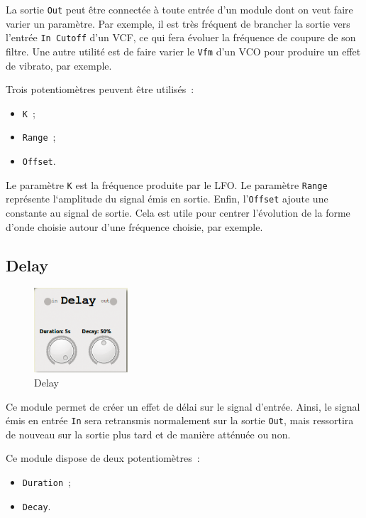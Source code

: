 \documentclass[a4paper,oneside,frenchb,10pt]{article}
\begin{document}
La sortie \verb!Out! peut être connectée à toute entrée d'un module dont
on veut faire varier un paramètre. Par exemple, il est très fréquent de
brancher la sortie vers l'entrée \verb!In Cutoff! d'un VCF, ce qui fera
évoluer la fréquence de coupure de son filtre. Une autre utilité est de
faire varier le \verb!Vfm! d'un VCO pour produire un effet de vibrato,
par exemple.

Trois potentiomètres peuvent être utilisés~:

\begin{itemize}
\item
  \verb!K!~;
\item
  \verb!Range!~;
\item
  \verb!Offset!.
\end{itemize}
Le paramètre \verb!K! est la fréquence produite par le LFO. Le paramètre
\verb!Range! représente l`amplitude du signal émis en sortie. Enfin,
l'\verb!Offset! ajoute une constante au signal de sortie. Cela est utile
pour centrer l'évolution de la forme d'onde choisie autour d'une
fréquence choisie, par exemple.

\subsection{Delay}

\begin{multicols}{2}

\begin{figure}[H]
\centering
\includegraphics[width=3.5cm]{../img/png/delay.png}
\caption{Delay}
\end{figure}

Ce module permet de créer un effet de délai sur le signal d'entrée.
Ainsi, le signal émis en entrée \verb!In! sera retransmis normalement
sur la sortie \verb!Out!, mais ressortira de nouveau sur la sortie plus
tard et de manière atténuée ou non.
\end{multicols}

Ce module dispose de deux potentiomètres~:

\begin{itemize}
\item
  \verb!Duration!~;
\item
  \verb!Decay!.
\end{itemize}
\end{document}
